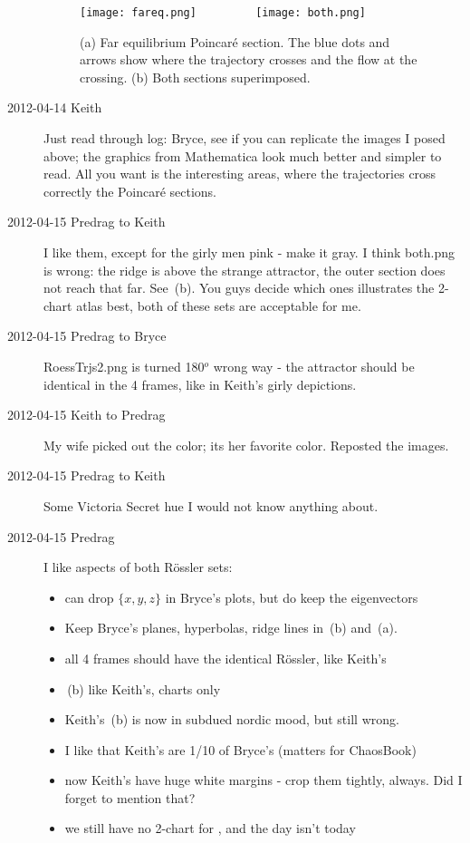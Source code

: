 \begin{description}
 \begin{figure}[H]
 \begin{center}
\texttt{[image: fareq.png]}%
~~~~~~~~
\texttt{[image: both.png]}%
 \end{center}
 \caption{
(a)
Far equilibrium Poincar\'e section. The blue dots and arrows show where
the trajectory crosses and the flow at the crossing.
(b)
Both sections superimposed.
    }{\label{fig:bothpoin}}
 \end{figure}

\item[2012-04-14 Keith] Just read through log: Bryce, see if you can
replicate the images I posed above; the graphics from Mathematica look
much better and simpler to read.  All you want is the interesting areas,
where the trajectories cross correctly the Poincar\'e sections.

\item[2012-04-15 Predrag to Keith] I like them, except for the girly men
pink - make it gray. I think both.png is wrong: the ridge is above the
strange attractor, the outer section does not reach that far. See
\,(b). You guys decide which ones illustrates the
2-chart atlas  best, both of these sets are acceptable for me.


\item[2012-04-15 Predrag to Bryce] RoessTrjs2.png is turned 180$^o$ wrong
way - the attractor should be identical in the 4 frames, like in Keith's
girly depictions.

\item[2012-04-15 Keith to Predrag] My wife picked out the color; its her
favorite color.  Reposted the images.

\item[2012-04-15 Predrag to Keith]
Some Victoria Secret hue I would not know anything about.

\item[2012-04-15 Predrag] I like aspects of both R\"ossler sets:

\begin{itemize}
  \item can drop $\{x,y,z\}$ in Bryce's plots, but do keep the eigenvectors
  \item Keep Bryce's planes, hyperbolas, ridge lines in
        \,(b) and \,(a).
  \item all 4 frames should have the identical R\"ossler, like Keith's
  \item {}\,(b) like Keith's, charts only
  \item Keith's \,(b) is now in subdued nordic mood, but still
        wrong.
  \item I like that Keith's are 1/10 of Bryce's (matters for ChaosBook)
  \item now Keith's have huge white margins - crop them tightly, always.
        Did I forget to mention that?
  \item we still have no 2-chart for \cLe, and the day isn't today
\end{itemize}


\end{description}
